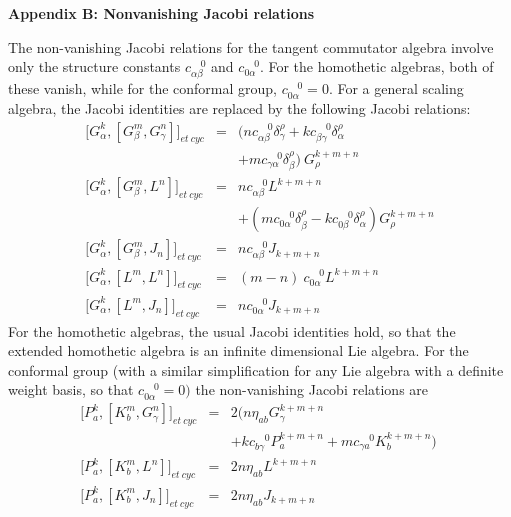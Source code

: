 \documentclass[a4paper,12pt]{article}
\begin{document}
\bigskip

\noindent \textbf{Appendix B: Nonvanishing Jacobi relations }

\medskip The non-vanishing Jacobi relations for the tangent commutator
algebra involve only the structure constants $c_{\alpha \beta }^{\quad 0}$
and $c_{0\alpha }^{\quad 0}.$ For the homothetic algebras, both of these
vanish, while for the conformal group, $c_{0\alpha }^{\quad 0}=0.$ For a
general scaling algebra, the Jacobi identities are replaced by the following
Jacobi relations: 
\begin{eqnarray}
\lbrack G_{\alpha }^{k},[G_{\beta }^{m},G_{\gamma }^{n}]]_{et\ cyc}
&=&(nc_{\alpha \beta }^{\quad 0}\delta _{\gamma }^{\rho }+kc_{\beta \gamma
}^{\quad 0}\delta _{\alpha }^{\rho } \\
&&+mc_{\gamma \alpha }^{\quad 0}\delta _{\beta }^{\rho })\ G_{\rho }^{k+m+n}
\\
\lbrack G_{\alpha }^{k},[G_{\beta }^{m},L^{n}]]_{et\ cyc} &=&nc_{\alpha
\beta }^{\quad 0}L^{k+m+n} \\
&&+(mc_{0\alpha }^{\quad 0}\delta _{\beta }^{\rho }-kc_{0\beta }^{\quad
0}\delta _{\alpha }^{\rho })G_{\rho }^{k+m+n} \\
\lbrack G_{\alpha }^{k},[G_{\beta }^{m},J_{n}]]_{et\ cyc} &=&nc_{\alpha
\beta }^{\quad 0}J_{k+m+n} \\
\lbrack G_{\alpha }^{k},[L^{m},L^{n}]]_{et\ cyc} &=&(m-n)\ c_{0\alpha
}^{\quad 0}L^{k+m+n} \\
\lbrack G_{\alpha }^{k},[L^{m},J_{n}]]_{et\ cyc} &=&nc_{0\alpha }^{\quad
0}J_{k+m+n}
\end{eqnarray}
For the homothetic algebras, the usual Jacobi identities hold, so that the
extended homothetic algebra is an infinite dimensional Lie algebra. For the
conformal group (with a similar simplification for any Lie algebra with a
definite weight  basis, so that $c_{0\alpha }^{\quad 0}=0)$ the
non-vanishing Jacobi relations are 
\begin{eqnarray}
\lbrack P_{a}^{k},[K_{b}^{m},G_{\gamma }^{n}]]_{et\ cyc} &=&2(n\eta
_{ab}G_{\gamma }^{k+m+n} \\
&&+kc_{b\gamma }^{\quad 0}P_{a}^{k+m+n}+mc_{\gamma a}^{\quad
0}K_{b}^{k+m+n})\  \\
\lbrack P_{a}^{k},[K_{b}^{m},L^{n}]]_{et\ cyc} &=&2n\eta _{ab}L^{k+m+n} \\
\lbrack P_{a}^{k},[K_{b}^{m},J_{n}]]_{et\ cyc} &=&2n\eta _{ab}J_{k+m+n}
\end{eqnarray}

\smallskip
\end{document}
